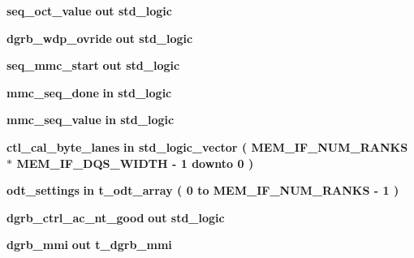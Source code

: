 \begin{DoxyCompactItemize}
\item 
{\bf seq\+\_\+oct\+\_\+value}  {\bfseries {\bfseries \textcolor{keywordflow}{out}\textcolor{vhdlchar}{ }}} {\bfseries \textcolor{comment}{std\+\_\+logic}\textcolor{vhdlchar}{ }} 
\item 
{\bf dgrb\+\_\+wdp\+\_\+ovride}  {\bfseries {\bfseries \textcolor{keywordflow}{out}\textcolor{vhdlchar}{ }}} {\bfseries \textcolor{comment}{std\+\_\+logic}\textcolor{vhdlchar}{ }} 
\item 
{\bf seq\+\_\+mmc\+\_\+start}  {\bfseries {\bfseries \textcolor{keywordflow}{out}\textcolor{vhdlchar}{ }}} {\bfseries \textcolor{comment}{std\+\_\+logic}\textcolor{vhdlchar}{ }} 
\item 
{\bf mmc\+\_\+seq\+\_\+done}  {\bfseries {\bfseries \textcolor{keywordflow}{in}\textcolor{vhdlchar}{ }}} {\bfseries \textcolor{comment}{std\+\_\+logic}\textcolor{vhdlchar}{ }} 
\item 
{\bf mmc\+\_\+seq\+\_\+value}  {\bfseries {\bfseries \textcolor{keywordflow}{in}\textcolor{vhdlchar}{ }}} {\bfseries \textcolor{comment}{std\+\_\+logic}\textcolor{vhdlchar}{ }} 
\item 
{\bf ctl\+\_\+cal\+\_\+byte\+\_\+lanes}  {\bfseries {\bfseries \textcolor{keywordflow}{in}\textcolor{vhdlchar}{ }}} {\bfseries \textcolor{comment}{std\+\_\+logic\+\_\+vector}\textcolor{vhdlchar}{ }\textcolor{vhdlchar}{(}\textcolor{vhdlchar}{ }\textcolor{vhdlchar}{ }\textcolor{vhdlchar}{ }\textcolor{vhdlchar}{ }{\bfseries {\bf M\+E\+M\+\_\+\+I\+F\+\_\+\+N\+U\+M\+\_\+\+R\+A\+N\+KS}} \textcolor{vhdlchar}{$\ast$}\textcolor{vhdlchar}{ }\textcolor{vhdlchar}{ }\textcolor{vhdlchar}{ }{\bfseries {\bf M\+E\+M\+\_\+\+I\+F\+\_\+\+D\+Q\+S\+\_\+\+W\+I\+D\+TH}} \textcolor{vhdlchar}{-\/}\textcolor{vhdlchar}{ } \textcolor{vhdldigit}{1} \textcolor{vhdlchar}{ }\textcolor{keywordflow}{downto}\textcolor{vhdlchar}{ }\textcolor{vhdlchar}{ } \textcolor{vhdldigit}{0} \textcolor{vhdlchar}{ }\textcolor{vhdlchar}{)}\textcolor{vhdlchar}{ }} 
\item 
{\bf odt\+\_\+settings}  {\bfseries {\bfseries \textcolor{keywordflow}{in}\textcolor{vhdlchar}{ }}} {\bfseries {\bfseries {\bf t\+\_\+odt\+\_\+array}} \textcolor{vhdlchar}{ }\textcolor{vhdlchar}{(}\textcolor{vhdlchar}{ }\textcolor{vhdlchar}{ } \textcolor{vhdldigit}{0} \textcolor{vhdlchar}{ }\textcolor{keywordflow}{to}\textcolor{vhdlchar}{ }\textcolor{vhdlchar}{ }\textcolor{vhdlchar}{ }\textcolor{vhdlchar}{ }{\bfseries {\bf M\+E\+M\+\_\+\+I\+F\+\_\+\+N\+U\+M\+\_\+\+R\+A\+N\+KS}} \textcolor{vhdlchar}{-\/}\textcolor{vhdlchar}{ } \textcolor{vhdldigit}{1} \textcolor{vhdlchar}{ }\textcolor{vhdlchar}{)}\textcolor{vhdlchar}{ }} 
\item 
{\bf dgrb\+\_\+ctrl\+\_\+ac\+\_\+nt\+\_\+good}  {\bfseries {\bfseries \textcolor{keywordflow}{out}\textcolor{vhdlchar}{ }}} {\bfseries \textcolor{comment}{std\+\_\+logic}\textcolor{vhdlchar}{ }} 
\item 
{\bf dgrb\+\_\+mmi}  {\bfseries {\bfseries \textcolor{keywordflow}{out}\textcolor{vhdlchar}{ }}} {\bfseries {\bfseries {\bf t\+\_\+dgrb\+\_\+mmi}} \textcolor{vhdlchar}{ }} 
\end{DoxyCompactItemize}


